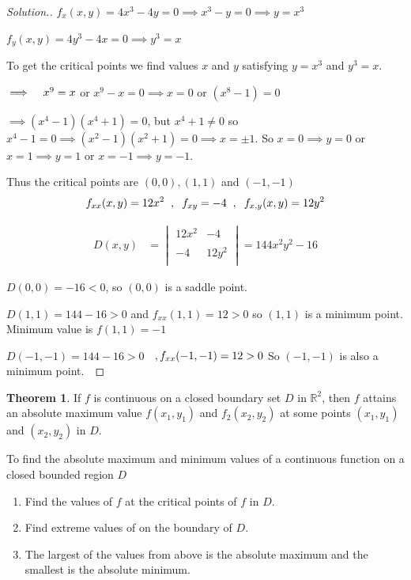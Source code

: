 \documentclass[11pt,a4paper]{article}
\theoremstyle{definition}
\newtheorem{thm}{Theorem}[subsection]
\newenvironment{solution}
  {\renewcommand{\qedsymbol}{}\begin{proof}[\textit{Solution}.]}
  {\end{proof}}
\begin{document}
\begin{solution}


$f_x(x,y) = 4x^3 -4y = 0 \implies x^3 - y = 0 \implies y = x^3$


$f_y(x,y) = 4y^3 - 4x = 0 \implies y^3 = x$


To get the critical points we find values $x$ and $y$ satisfying $y = x^3$ and $y^3 = x$.


$\implies\hspace{0.3cm} x^9 = x$ or $x^9 - x = 0\implies x = 0$ or $(x^8 - 1)  = 0$


$\implies (x^4- 1)(x^4 + 1) = 0$, but $x^4 + 1 \neq 0$ so $x^4 - 1 = 0 \implies (x^2 - 1)(x^2 + 1) = 0 \implies x = \pm 1$. So $x = 0 \implies y = 0$ or $x  = 1\implies y = 1$ or $x = -1 \implies y = -1$.


Thus the critical points are $(0,0), (1,1)$ and $(-1,-1)$
$$f_{xx}(x,y) = 12x^2\hspace{0.2cm}, \hspace{0.2cm} f_{xy} = -4 \hspace{0.2cm} , \hspace{0.2cm} f_{x,y}(x,y) = 12y^2$$

\begin{align*}
D(x,y) & = \begin{vmatrix}
12x^2 & -4\\\\
-4 & 12y^2\\
\end{vmatrix}  = 144x^2y^2 - 16
\end{align*}

$D(0,0) = -16 < 0$, so $(0,0)$ is a saddle point.


$D(1,1) = 144 - 16> 0$ and $f_{xx} (1,1) = 12> 0$ so $(1,1)$ is a minimum point. Minimum value is $f(1,1) = -1$


$D(-1,-1) = 144 - 16> 0$ $\hspace{0.2cm} , f_{xx} (-1,-1) = 12>0$ So $(-1, -1)$ is also a minimum point.\
\end{solution}


\begin{thm}


If $f$ is continuous on a closed boundary set $D$ in $\mathbb{R}^2$, then $f$ attains an absolute maximum value $f(x_1,y_1)$ and $f_2(x_2,y_2)$ at some points $(x_1,y_1)$ and $(x_2,y_2)$ in $D$.


To find the absolute maximum and minimum values of a continuous function on a closed bounded region $D$
\begin{enumerate}
\item Find the values of $f$ at the critical points of $f$ in $D$.
\item Find extreme values of on the boundary of $D$.
\item The largest of the values from above is the absolute maximum and the smallest is the absolute minimum.
\end{enumerate} 
\end{thm}
\end{document}

